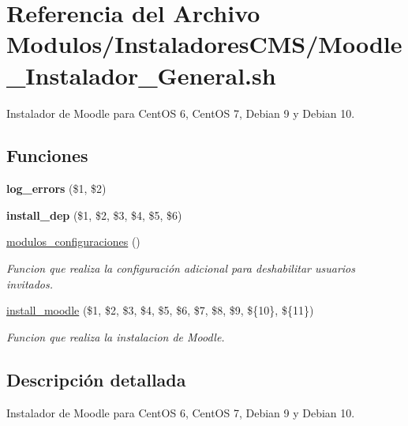 \hypertarget{Moodle__Instalador__General_8sh}{}\section{Referencia del Archivo Modulos/\+Instaladores\+C\+M\+S/\+Moodle\+\_\+\+Instalador\+\_\+\+General.sh}
\label{Moodle__Instalador__General_8sh}


Instalador de Moodle para Cent\+OS 6, Cent\+OS 7, Debian 9 y Debian 10.  


\subsection*{Funciones}
\begin{DoxyCompactItemize}
\item 
\mbox{\label{Moodle__Instalador__General_8sh_a92067b58a8478c9841b2cd9b75ea3565}} 
{\bfseries log\+\_\+errors} (\$1, \$2)
\item 
\mbox{\label{Moodle__Instalador__General_8sh_a0def5b6b697b8869c4772673d56a5a4a}} 
{\bfseries install\+\_\+dep} (\$1, \$2, \$3, \$4, \$5, \$6)
\item 
\mbox{\label{Moodle__Instalador__General_8sh_aea4a77382150307c5f564b82c6321f01}} 
\hyperlink{Moodle__Instalador__General_8sh_aea4a77382150307c5f564b82c6321f01}{modulos\+\_\+configuraciones} ()
\begin{DoxyCompactList}\small\item\em Funcion que realiza la configuración adicional para deshabilitar usuarios invitados. \end{DoxyCompactList}\item 
\hyperlink{Moodle__Instalador__General_8sh_a918304e5f7b510c25d98d774d24a593b}{install\+\_\+moodle} (\$1, \$2, \$3, \$4, \$5, \$6, \$7, \$8, \$9, \$\{10\}, \$\{11\})
\begin{DoxyCompactList}\small\item\em Funcion que realiza la instalacion de Moodle. \end{DoxyCompactList}\end{DoxyCompactItemize}


\subsection{Descripción detallada}
Instalador de Moodle para Cent\+OS 6, Cent\+OS 7, Debian 9 y Debian 10. 

